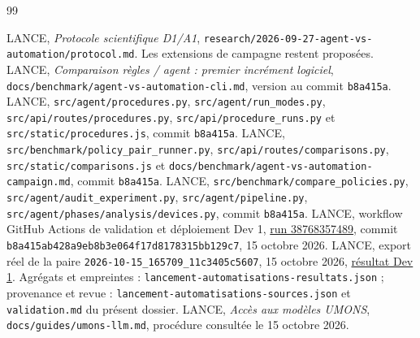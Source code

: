\documentclass[11pt,a4paper]{article}
\newcommand{\code}[1]{\nolinkurl{#1}}
\begin{document}
\begin{thebibliography}{99}\small\raggedright
{}
 LANCE, \emph{Protocole scientifique D1/A1},
\code{research/2026-09-27-agent-vs-automation/protocol.md}. Les extensions de campagne restent proposées.
 LANCE, \emph{Comparaison règles / agent : premier incrément logiciel},
\code{docs/benchmark/agent-vs-automation-cli.md}, version au commit \code{b8a415a}.
 LANCE, \code{src/agent/procedures.py},
\code{src/agent/run_modes.py}, \code{src/api/routes/procedures.py},
\code{src/api/procedure_runs.py} et \code{src/static/procedures.js}, commit \code{b8a415a}.
 LANCE, \code{src/benchmark/policy_pair_runner.py},
\code{src/api/routes/comparisons.py}, \code{src/static/comparisons.js} et
\code{docs/benchmark/agent-vs-automation-campaign.md}, commit \code{b8a415a}.
 LANCE, \code{src/benchmark/compare_policies.py},
\code{src/agent/audit_experiment.py}, \code{src/agent/pipeline.py},
\code{src/agent/phases/analysis/devices.py}, commit \code{b8a415a}.
 LANCE, workflow GitHub Actions de validation et déploiement Dev 1,
\href{https://github.com/Tanguyvans/LANCE/actions/runs/38768357489}{run 38768357489},
commit \code{b8a415ab428a9eb8b3e064f17d8178315bb129c7}, 15 octobre 2026.
 LANCE, export réel de la paire
\code{2026-10-15_165709_11c3405c5607}, 15 octobre 2026,
\href{http://100.103.253.86:8502/\#comparison/2026-10-15_165709_11c3405c5607}{résultat Dev 1}.
Agrégats et empreintes : \code{lancement-automatisations-resultats.json} ; provenance et revue :
\code{lancement-automatisations-sources.json} et \code{validation.md} du présent dossier.
 LANCE, \emph{Accès aux modèles UMONS},
\code{docs/guides/umons-llm.md}, procédure consultée le 15 octobre 2026.
\end{thebibliography}
\end{document}
